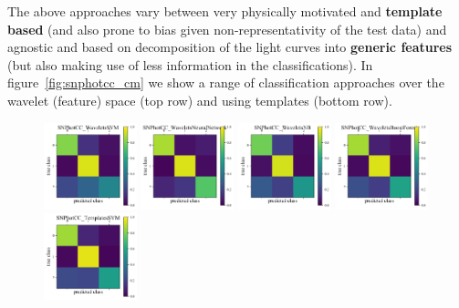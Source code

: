 The above approaches vary between very physically motivated and \textbf{template based} (and also prone to bias given non-representativity of the test data) and agnostic and based on decomposition of the light curves into \textbf{generic features} (but also making use of less information in the classifications). 
In figure~\ref{fig:snphotcc_cm} we show a range of classification approaches over the wavelet (feature) space (top row) and using templates (bottom row).


\begin{figure}
	\begin{center}
		\includegraphics[width=0.24\textwidth]{./fig/SNPhotCC_WaveletsSVM_cm.png}
		\includegraphics[width=0.24\textwidth]{./fig/SNPhotCC_WaveletsNeuralNetwork_cm.png}
		\includegraphics[width=0.24\textwidth]{./fig/SNPhotCC_WaveletsNB_cm.png}
		\includegraphics[width=0.24\textwidth]{./fig/SNPhotCC_WaveletsBoostForest_cm.png}\\
		\includegraphics[width=0.24\textwidth]{./fig/SNPhotCC_TemplatesSVM_cm.png}

\end{center}
\end{figure}

